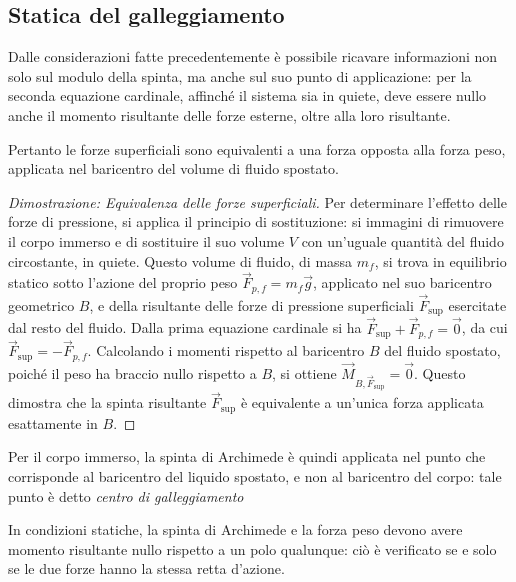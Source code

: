 \documentclass[11pt, a4paper, openright]{book}
\theoremstyle{plain}
\theoremstyle{definition}
\begin{document}
\subsection{Statica del galleggiamento}
Dalle considerazioni fatte precedentemente è possibile ricavare informazioni non solo sul modulo della spinta, ma anche sul suo punto di applicazione: per la seconda equazione cardinale, affinché il sistema sia in quiete, deve essere nullo anche il momento risultante delle forze esterne, oltre alla loro risultante.

Pertanto le forze superficiali sono equivalenti a una forza opposta alla forza peso, applicata nel baricentro del volume di fluido spostato.

\begin{proof}[Dimostrazione: Equivalenza delle forze superficiali]
Per determinare l'effetto delle forze di pressione, si applica il principio di sostituzione: si immagini di rimuovere il corpo immerso e di sostituire il suo volume $V$ con un'uguale quantità del fluido circostante, in quiete.
Questo volume di fluido, di massa $m_f$, si trova in equilibrio statico sotto l'azione del proprio peso $\vec{F}_{p, f} = m_f \vec{g}$, applicato nel suo baricentro geometrico $B$, e della risultante delle forze di pressione superficiali $\vec{F}_{\text{sup}}$ esercitate dal resto del fluido.
Dalla prima equazione cardinale si ha $\vec{F}_{\text{sup}} + \vec{F}_{p, f} = \vec{0}$, da cui $\vec{F}_{\text{sup}} = -\vec{F}_{p, f}$.
Calcolando i momenti rispetto al baricentro $B$ del fluido spostato, poiché il peso ha braccio nullo rispetto a $B$, si ottiene $\vec{M}_{B, \vec{F}_{{\text{sup}}}} = \vec{0}$. Questo dimostra che la spinta risultante $\vec{F}_{\text{sup}}$ è equivalente a un'unica forza applicata esattamente in $B$.
\end{proof}

Per il corpo immerso, la spinta di Archimede è quindi applicata nel punto che corrisponde al baricentro del liquido spostato, e non al baricentro del corpo: tale punto è detto \emph{centro di galleggiamento}

In condizioni statiche, la spinta di Archimede e la forza peso devono avere momento risultante nullo rispetto a un polo qualunque: ciò è verificato se e solo se le due forze hanno la stessa retta d'azione.
\end{document}
